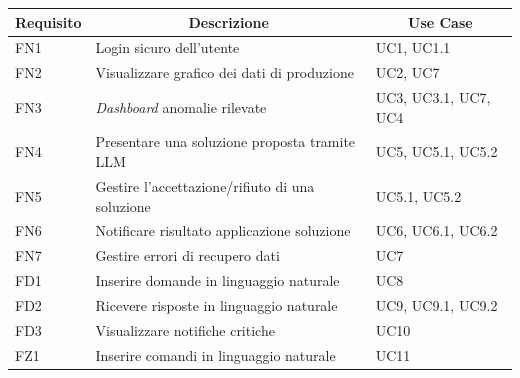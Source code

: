 \begin{center}
  \brandTableColors
  \begin{longtable}{|p{2.25cm}|p{7.75cm}|p{2.25cm}|}
    \hline
    \multicolumn{1}{|c|}{\textbf{Requisito}} &
    \multicolumn{1}{c|}{\textbf{Descrizione}} &
    \multicolumn{1}{c|}{\textbf{Use Case}}\\
    \hline
    FN1 & Login sicuro dell'utente                                    & UC1, UC1.1 \\ \hline
    FN2 & Visualizzare grafico dei dati di produzione                 & UC2, UC7   \\ \hline
    FN3 & \textit{Dashboard} anomalie rilevate                               & UC3, UC3.1, UC7, UC4 \\ \hline
    FN4 & Presentare una soluzione proposta tramite LLM               & UC5, UC5.1, UC5.2 \\ \hline
    FN5 & Gestire l'accettazione/rifiuto di una soluzione             & UC5.1, UC5.2 \\ \hline
    FN6 & Notificare risultato applicazione soluzione                 & UC6, UC6.1, UC6.2 \\ \hline
    FN7 & Gestire errori di recupero dati                             & UC7        \\ \hline
    FD1 & Inserire domande in linguaggio naturale                     & UC8        \\ \hline
    FD2 & Ricevere risposte in linguaggio naturale                    & UC9, UC9.1, UC9.2 \\ \hline
    FD3 & Visualizzare notifiche critiche                             & UC10       \\ \hline
    FZ1 & Inserire comandi in linguaggio naturale                     & UC11       \\ \hline
  \end{longtable}
  \label{tab:requisiti_fun}
\end{center}

